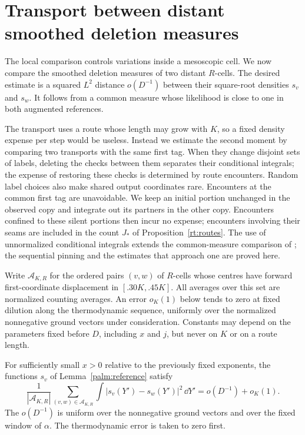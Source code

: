 \section{Transport between distant smoothed deletion measures}
\label{long:section}
\label{sec:long-palm}

The local comparison controls variations inside a mesoscopic cell.  We now
compare the smoothed deletion measures of two distant $R$-cells.  The
desired estimate is a squared $L^2$ distance $o(D^{-1})$ between their
square-root densities $s_v$ and $s_w$.  It follows from a common measure
whose likelihood is close to one in both augmented references.

The transport uses a route whose length may grow with $K$, so a fixed
density expense per step would be useless.  Instead we estimate the
second moment by comparing two transports with the same first tag.
When they change disjoint sets of labels, deleting the checks between
them separates their conditional integrals; the expense of restoring
these checks is determined by route encounters.  Random label choices
also make shared output coordinates rare.  Encounters
at the common first tag are unavoidable.  We keep an initial portion
unchanged in the observed copy and integrate out its partners in the
other copy.  Encounters confined to these silent portions then incur no
expense; encounters involving their seams are included in the count
$J_*$ of Proposition~\ref{rt:routes}.
The use of unnormalized conditional integrals extends the common-measure
comparison of \cite[Section~8]{H}; the sequential pinning and the estimates
that approach one are proved here.

Write $\mathcal A_{K,R}$ for the ordered pairs $(v,w)$ of $R$-cells whose
centres have forward first-coordinate displacement in $[.30K,.45K]$.
All averages over this set are normalized counting averages.  An error
$o_K(1)$ below tends to zero at fixed dilution along the thermodynamic
sequence, uniformly over the normalized nonnegative ground vectors under
consideration.  Constants may depend on the parameters fixed before $D$,
including $x$ and $j$, but never on $K$ or on a route length.

\begin{proposition}\label{long:comparison}
For sufficiently small $x>0$ relative to the previously fixed exponents,
the functions $s_v$ of Lemma~\ref{palm:reference} satisfy
\begin{equation}\label{long:hellinger}
 \frac1{|\mathcal A_{K,R}|}\sum_{(v,w)\in\mathcal A_{K,R}}
       \int |s_v(Y')-s_w(Y')|^2\,\dd Y'
       =o(D^{-1})+o_K(1).
\end{equation}
The $o(D^{-1})$ is uniform over the nonnegative ground vectors and over the
fixed window of $\alpha$.  The thermodynamic error is taken to zero first.
\end{proposition}

